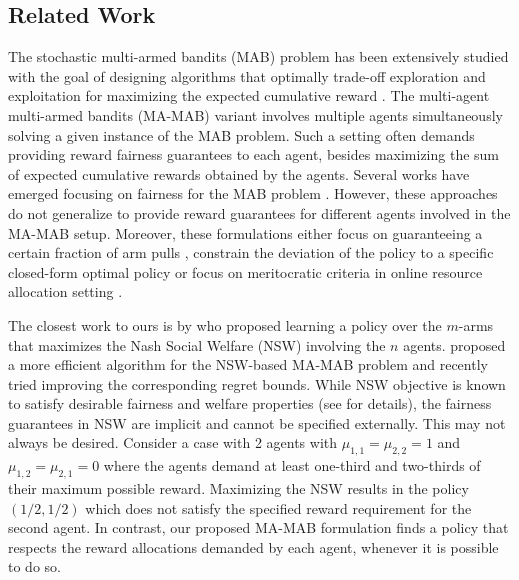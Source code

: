 \subsection{Related Work}
\label{sec:relWork}
The stochastic multi-armed bandits (MAB) problem has been extensively studied with the goal of designing algorithms that optimally trade-off exploration and exploitation for maximizing the expected cumulative reward \cite{Lattimore2020BanditA, slivkins2024introductionmultiarmedbandits, bubeck2012regretanalysisstochasticnonstochastic}. The multi-agent multi-armed bandits (MA-MAB) variant \cite{Liu2009DistributedLI} involves multiple agents simultaneously solving a given instance of the MAB problem. Such a setting often demands providing reward fairness guarantees to each agent, besides maximizing the sum of expected cumulative rewards obtained by the agents. Several works have emerged focusing on fairness for the MAB problem \cite{JMLR:v22:20-704,wang2021fairness,sinha2023textttbanditq,baudry2024, porat21, liu2017calibrated, patil2022mitigating,krishna25pmean}. However, these approaches do not generalize to provide reward guarantees for different agents involved in the MA-MAB setup. Moreover, these formulations either focus on guaranteeing a certain fraction of arm pulls \cite{JMLR:v22:20-704,sinha2023textttbanditq, porat21},  constrain the deviation of the policy to a specific closed-form optimal policy \cite{wang2021fairness,baudry2024} or focus on meritocratic criteria in online resource allocation setting \cite{patil2022mitigating, liu2017calibrated}. 


The closest work to ours is by     \citet{Hossain2020FairAF} who proposed learning a policy over the $m$-arms that maximizes the Nash Social Welfare (NSW) involving the $n$ agents. \citet{Jones_Nguyen_Nguyen_2023} proposed a more efficient algorithm for the NSW-based MA-MAB problem and recently \citet{Zhang2024NoRegretLF} tried improving the corresponding regret bounds. While NSW objective is known to satisfy desirable fairness and welfare properties (see \cite{NSW, caragiannis2019unreasonable} for details), the fairness guarantees in NSW are implicit and cannot be specified externally. This may not always be desired. Consider a case with 2 agents with $\mu_{1, 1}=\mu_{2,2}=1$ and $\mu_{1, 2}=\mu_{2, 1}=0$ where the agents demand at least one-third and two-thirds of their maximum possible reward. Maximizing the NSW results in the policy $(1/2, 1/2)$ which does not satisfy the specified reward requirement for the   second agent. In contrast, our proposed MA-MAB formulation finds a policy that respects the reward allocations demanded by each agent, whenever it is possible to do so.


